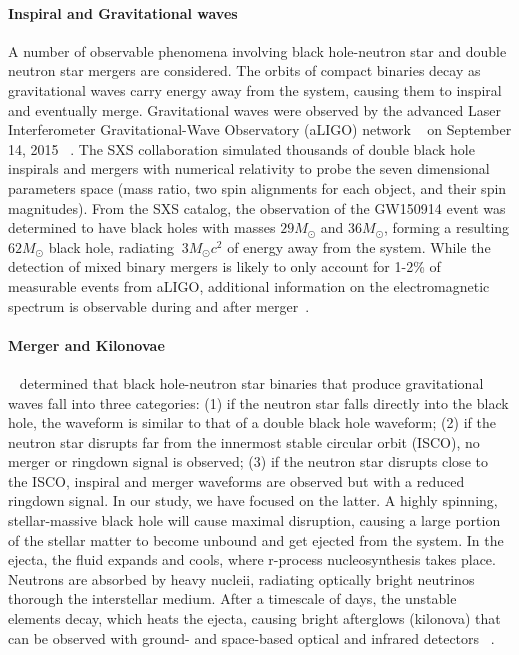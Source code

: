 \paragraph{Inspiral and Gravitational waves}
A number of observable phenomena involving black hole-neutron star and double neutron star mergers are considered.  
The orbits of compact binaries decay as gravitational waves carry energy away from the system, causing them to inspiral and eventually merge.  
Gravitational waves were observed by the advanced Laser Interferometer Gravitational-Wave Observatory (aLIGO) network ~\cite{aLIGO2} on September 14, 2015 ~\cite{LIGOVirgo2016a,Abbott:2016nmj}. 
The SXS collaboration simulated thousands of double black hole inspirals and mergers with numerical relativity to probe the seven dimensional parameters space (mass ratio, two spin alignments for each object, and their spin magnitudes).  
From the SXS catalog, the observation of the GW150914 event was determined to have black holes with masses $29 M_\odot$ and $36 M_\odot$, forming a resulting $62 M_\odot$ black hole, radiating $~3 M_\odot c^2$ of energy away from the system.
While the detection of mixed binary mergers is likely to only account for 1-2\% of measurable events from aLIGO, additional information on the electromagnetic spectrum is observable during and after merger~\cite{1976ApJ...210..549L,Li:1998bw,Roberts2011,Kasen:2013xka,Tanaka:2013ana}. 

\paragraph{Merger and Kilonovae}
~\cite{Shibata:2009cn} determined that black hole-neutron star binaries that produce gravitational waves fall into three categories: 
(1) if the neutron star falls directly into the black hole, the waveform is similar to that of a double black hole waveform; 
(2) if the neutron star disrupts far from the innermost stable circular orbit (ISCO), no merger or ringdown signal is observed; 
(3) if the neutron star disrupts close to the ISCO, inspiral and merger waveforms are observed but with a reduced ringdown signal.
In our study, we have focused on the latter. 
A highly spinning, stellar-massive black hole will cause maximal disruption, causing a large portion of the stellar matter to become unbound and get ejected from the system.
In the ejecta, the fluid expands and cools, where r-process nucleosynthesis takes place.  
Neutrons are absorbed by heavy nucleii, radiating optically bright neutrinos thorough the interstellar medium. 
After a timescale of days, the unstable elements decay, which heats the ejecta, causing bright afterglows (kilonova) that can be observed with ground- and space-based optical and infrared detectors ~\cite{tanvir2013kilonova}.


